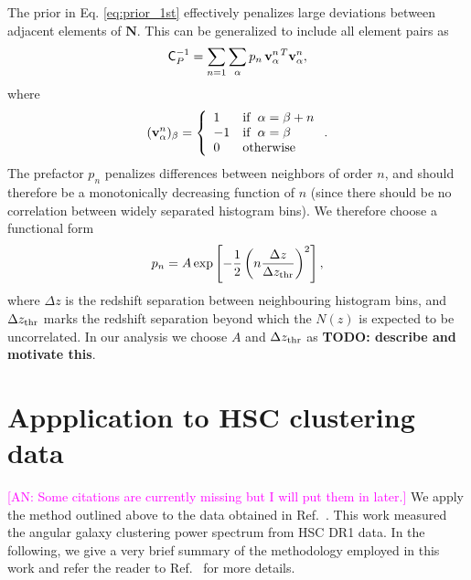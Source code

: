 \documentclass[a4paper,11pt]{article}
\newcommand{\todo}[1]{{\bf TODO: #1}}
\newcommand{\an}[1]{{\textcolor{magenta}{[AN: #1]}}}
\newcommand{\vN}{\mathbf{N}}
\begin{document}
      The prior in Eq. \ref{eq:prior_1st} effectively penalizes large deviations between adjacent elements of $\vN$. This can be generalized to include all element pairs as
      \begin{equation}\label{eq:smooth1}
        {\sf C}^{-1}_P=\sum_{n=1}\sum_{\alpha}p_n\,{\bf v}^{n\,T}_\alpha{\bf v}^n_\alpha,
      \end{equation}
      where
      \begin{equation}
        ({\bf v}^n_\alpha)_\beta=\left\{
        \begin{array}{ll}
          1  & {\rm if}\,\,\, \alpha=\beta+n\\
          -1  &  {\rm if}\,\,\, \alpha=\beta\\
          0 & {\rm otherwise}
        \end{array} \right..
      \end{equation}
      The prefactor $p_n$ penalizes differences between neighbors of order $n$, and should therefore be a monotonically decreasing function of $n$ (since there should be no correlation between widely separated histogram bins). We therefore choose a functional form
      \begin{equation}
        p_n=A\,{\rm exp}\left[-\frac{1}{2}\left(n\frac{\Delta z}{\Delta z_{\rm thr}}\right)^2\right],
      \end{equation}
      where $\Delta z$ is the redshift separation between neighbouring histogram bins, and $\Delta z_{\rm thr}$ marks the redshift separation beyond which the $N(z)$ is expected to be uncorrelated. In our analysis we choose $A$ and $\Delta z_{\rm thr}$ as \todo{describe and motivate this}.
      

  \section{Appplication to HSC clustering data}\label{sec:hsc}
    \an{Some citations are currently missing but I will put them in later.}
    We apply the method outlined above to the data obtained in Ref.~\cite{1912.08209}. This work measured the angular galaxy clustering power spectrum from HSC DR1 data. In the following, we give a very brief summary of the methodology employed in this work and refer the reader to Ref.~\cite{1912.08209} for more details.
\end{document}
